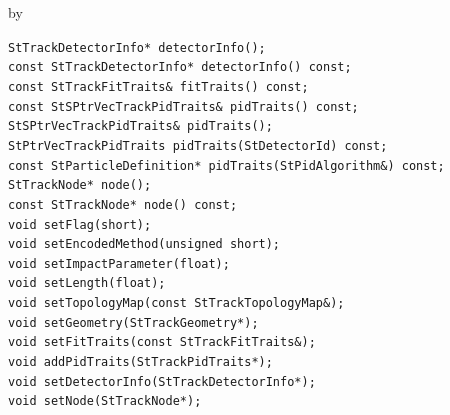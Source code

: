 \documentclass[twoside]{article}
\newcommand{\entrylabel}[1]{\mbox{\textbf{{#1}}}\hfil}%
\newenvironment{entry}
{\begin{list}{}%
    {\renewcommand{\makelabel}{\entrylabel}%
     \setlength{\labelwidth}{90pt}%
     \setlength{\leftmargin}{\labelwidth}
     \advance\leftmargin by \labelsep%
      }%
    }%
  {\end{list}}
\newcommand{\Entrylabel}[1]%
{\raisebox{0pt}[1ex][0pt]{\makebox[\labelwidth][l]%
    {\parbox[t]{\labelwidth}{\hspace{0pt}\textbf{{#1}}}}}}
\newenvironment{Entry}%
{\renewcommand{\entrylabel}{\Entrylabel}\begin{entry}}%
  {\end{entry}}
\begin{document}
\begin{Entry}
    \verb+StTrackDetectorInfo* detectorInfo();+\\
    \verb+const StTrackDetectorInfo* detectorInfo() const;+\\
    \verb+const StTrackFitTraits& fitTraits() const;+\\
    \verb+const StSPtrVecTrackPidTraits& pidTraits() const;+\\
    \verb+StSPtrVecTrackPidTraits& pidTraits();+\\
    \verb+StPtrVecTrackPidTraits pidTraits(StDetectorId) const;+\\
    \verb+const StParticleDefinition* pidTraits(StPidAlgorithm&) const;+\\
    \verb+StTrackNode* node();+\\
    \verb+const StTrackNode* node() const;+\\
    \verb+void setFlag(short);+\\
    \verb+void setEncodedMethod(unsigned short);+\\
    \verb+void setImpactParameter(float);+\\
    \verb+void setLength(float);+\\
    \verb+void setTopologyMap(const StTrackTopologyMap&);+\\
    \verb+void setGeometry(StTrackGeometry*);+\\
    \verb+void setFitTraits(const StTrackFitTraits&);+\\
    \verb+void addPidTraits(StTrackPidTraits*);+\\
    \verb+void setDetectorInfo(StTrackDetectorInfo*);+\\
    \verb+void setNode(StTrackNode*);+\\
\end{Entry}
\clearpage
\end{document}

